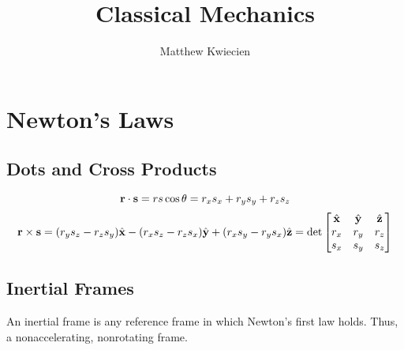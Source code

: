\documentclass{article}
\title{Classical Mechanics}
\author{Matthew Kwiecien}
\newcommand{\vh}[1]{\hat{\vb{#1}}}
\begin{document}
\maketitle

\section{Newton's Laws}
\subsection{Dots and Cross Products}
\begin{equation*}
   \vb{r} \cdot \vb{s} = rs\cos\theta = r_{x}s_{x}+r_{y}s_{y}+r_{z}s_{z}
\end{equation*}
\begin{equation*}
   \vb{r} \times \vb{s} =  (r_{y}s_{z}-r_{z}s_{y})\vh{x} - (r_{x}s_{z}-r_{z}s_{x})\vh{y} + 
   (r_{x}s_{y}-r_{y}s_{x})\vh{z} = 
   \det 
\begin{bmatrix}
    \vh{x} & \vh{y} & \vh{z} \\
    r_{x} & r_{y} & r_{z} \\
    s_{x} & s_{y} & s_{z} \\
\end{bmatrix}
\end{equation*}

\subsection{Inertial Frames}
An inertial frame is any reference frame in which Newton's first law holds.  Thus, a nonaccelerating, nonrotating frame.
\end{document}
